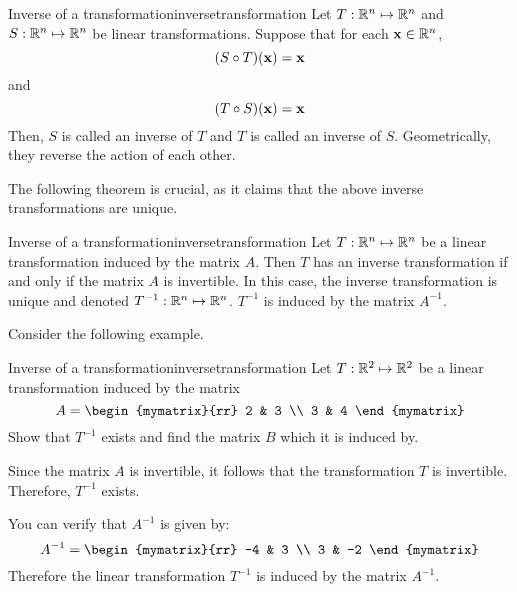 \begin{definition}{Inverse of a transformation}{inversetransformation}
Let $T: \mathbb{R}^n \mapsto \mathbb{R}^n$ and $S:\mathbb{R}^n \mapsto \mathbb{R}^n$ be linear transformations. Suppose that for each ${\bf x} \in \mathbb{R}^n$, 
\[
(S \circ T)({\bf x}) = {\bf x}
\]
and 
\[
(T \circ S)({\bf x}) = {\bf x}
\]
Then, $S$ is called an inverse of $T$  and $T$ is called an inverse of $S$. Geometrically, they reverse the action of each other. 
\end{definition}

The following theorem is crucial, as it claims that the above inverse transformations are unique. 

\begin{theorem}{Inverse of a transformation}{inversetransformation}
Let $T:\mathbb{R}^n \mapsto \mathbb{R}^n$ be a linear transformation induced by the matrix $A$. Then $T$ has an inverse transformation if and only if the matrix $A$ is invertible. In this case, the inverse transformation is unique and denoted $T^{-1}: \mathbb{R}^n \mapsto \mathbb{R}^n$. $T^{-1}$ is induced by the matrix $A^{-1}$. 
\end{theorem}

Consider the following example. 

\begin{example}{Inverse of a transformation}{inversetransformation}
Let $T: \mathbb{R}^2 \mapsto \mathbb{R}^2$ be a linear transformation induced by the matrix 
\[
A = 
\begin{mymatrix}{rr}
2 & 3 \\
3 & 4
\end{mymatrix}
\]
Show that $T^{-1}$ exists and find the matrix $B$ which it is induced by. 
\end{example}

\begin{solution}
Since the matrix $A$ is invertible, it follows that the transformation $T$ is invertible. Therefore, $T^{-1}$ exists. 

You can verify that $A^{-1}$ is given by:
\[
A^{-1}
=
\begin{mymatrix}{rr}
-4 & 3 \\
3 & -2
\end{mymatrix}
\]
Therefore the linear transformation $T^{-1}$ is induced by the matrix $A^{-1}$. 
\end{solution}
